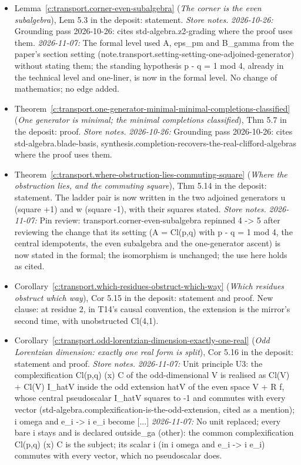 \documentclass[11pt]{article}
\theoremstyle{definition}
\theoremstyle{plain}
\begin{document}
\begin{itemize}
\item Lemma~\ref{c:transport.corner-even-subalgebra} (\emph{The corner is the even subalgebra}), Lem 5.3 in the deposit: statement. \emph{Store notes.} \emph{2026-10-26:} Grounding pass 2026-10-26: cites std-algebra.z2-grading where the proof uses them. \emph{2026-11-07:} The formal level used A, eps\_pm and B\_gamma from the paper's section setting (note.transport.setting-setting-one-adjoined-generator) without stating them; the standing hypothesis p - q = 1 mod 4, already in the technical level and one-liner, is now in the formal level. No change of mathematics; no edge added.
\item Theorem~\ref{c:transport.one-generator-minimal-minimal-completions-classified} (\emph{One generator is minimal; the minimal completions classified}), Thm 5.7 in the deposit: proof. \emph{Store notes.} \emph{2026-10-26:} Grounding pass 2026-10-26: cites std-algebra.blade-basis, synthesis.completion-recovers-the-real-clifford-algebras where the proof uses them.
\item Theorem~\ref{c:transport.where-obstruction-lies-commuting-square} (\emph{Where the obstruction lies, and the commuting square}), Thm 5.14 in the deposit: statement. The ladder pair is now written in the two adjoined generators u (square +1) and w (square -1), with their squares stated. \emph{Store notes.} \emph{2026-11-07:} Pin review: transport.corner-even-subalgebra repinned 4 -> 5 after reviewing the change that its setting (A = Cl(p,q) with p - q = 1 mod 4, the central idempotents, the even subalgebra and the one-generator ascent) is now stated in the formal; the isomorphism is unchanged; the use here holds as cited.
\item Corollary~\ref{c:transport.which-residues-obstruct-which-way} (\emph{Which residues obstruct which way}), Cor 5.15 in the deposit: statement and proof. New clause: at residue 2, in T14's causal convention, the extension is the mirror's second time, with unobstructed Cl(4,1).
\item Corollary~\ref{c:transport.odd-lorentzian-dimension-exactly-one-real} (\emph{Odd Lorentzian dimension: exactly one real form is split}), Cor 5.16 in the deposit: statement and proof. \emph{Store notes.} \emph{2026-11-07:} Unit principle U3: the complexification Cl(p,q) (x) C of the odd-dimensional V is realised as Cl(V) + Cl(V) I\_hatV inside the odd extension hatV of the even space V + R f, whose central pseudoscalar I\_hatV squares to -1 and commutes with every vector (std-algebra.complexification-is-the-odd-extension, cited as a mention); i omega and e\_i -> i e\_i become [...] \emph{2026-11-07:} No unit replaced; every bare i stays and is declared outside\_ga (other): the common complexification Cl(p,q) (x) C is the subject; its scalar i (in i omega and e\_i -> i e\_i) commutes with every vector, which no pseudoscalar does.

\end{itemize}
\end{document}

